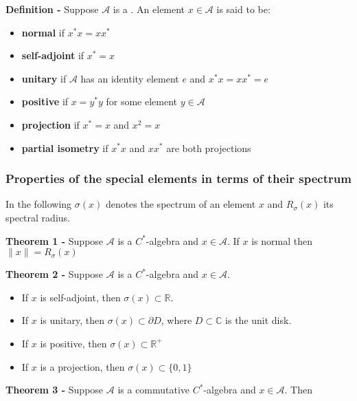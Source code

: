 \documentclass[12pt]{article}
\begin{document}

{\bf Definition -} Suppose $\mathcal{A}$ is a . An element $x \in \mathcal{A}$ is said to be:
\begin{itemize}
\item {\bf normal} if $x^*x = xx^*$
\item {\bf self-adjoint} if $x^* = x$
\item {\bf unitary} if $\mathcal{A}$ has an identity element $e$ and $x^*x = xx^* = e$
\item {\bf positive} if $x = y^*y$ for some element $y \in \mathcal{A}$
\item {\bf projection} if $x^* = x$ and $x^2=x$
\item {\bf partial isometry} if $x^*x$ and $xx^*$ are both projections
\end{itemize}

\subsubsection{Properties of the special elements in terms of their spectrum}

In the following $\sigma(x)$ denotes the spectrum of an element $x$ and $R_{\sigma}(x)$ its spectral radius.

{\bf Theorem 1 -} Suppose $\mathcal{A}$ is a $C^*$-algebra and $x \in \mathcal{A}$. If $x$ is normal then $\|x\| = R_{\sigma}(x)$

{\bf Theorem 2 -} Suppose $\mathcal{A}$ is a $C^*$-algebra and $x \in \mathcal{A}$.

\begin{itemize}
\item If $x$ is self-adjoint, then $\sigma(x) \subset \mathbb{R}$.
\item If $x$ is unitary, then $\sigma(x) \subset \partial D$, where $D \subset \mathbb{C}$ is the unit disk.
\item If $x$ is positive, then $\sigma(x) \subset \mathbb{R}^{+}$
\item If $x$ is a projection, then $\sigma(x) \subset \{0,1\}$
\end{itemize}

{\bf Theorem 3 -} Suppose $\mathcal{A}$ is a commutative $C^*$-algebra and $x \in \mathcal{A}$. Then
\end{document}
